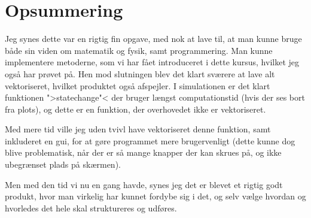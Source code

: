 \documentclass[a4paper,10pt]{article} 	%
\numberwithin{equation}{section}
\begin{document}
	\section{Opsummering}
	Jeg synes dette var en rigtig fin opgave, med nok at lave til, at man kunne bruge både sin viden om matematik og fysik, samt programmering. Man kunne implementere metoderne, som vi har fået introduceret i dette kursus, hvilket jeg også har prøvet på. Hen mod slutningen blev det klart sværere at lave alt vektoriseret, hvilket produktet også afspejler. I simulationen er det klart funktionen ">statechange"< der bruger længst computationstid (hvis der ses bort fra plots), og dette er en funktion, der overhovedet ikke er vektoriseret.
	
	Med mere tid ville jeg uden tvivl have vektoriseret denne funktion, samt inkluderet en gui, for at gøre programmet mere brugervenligt (dette kunne dog blive problematisk, når der er så mange knapper der kan skrues på, og ikke ubegrænset plads på skærmen).
	
	Men med den tid vi nu en gang havde, synes jeg det er blevet et rigtig godt produkt, hvor man virkelig har kunnet fordybe sig i det, og selv vælge hvordan og hvorledes det hele skal struktureres og udføres.
\end{document}
